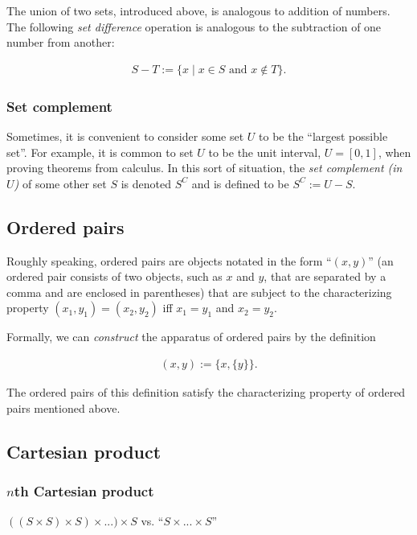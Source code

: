 The union of two sets, introduced above, is analogous to addition of numbers. The following \textit{set difference} operation is analogous to the subtraction of one number from another:

\begin{align*}
    S - T := \{ x \mid x \in S \text{ and } x \notin T \}.
\end{align*}

\subsubsection*{Set complement}

Sometimes, it is convenient to consider some set $U$ to be the ``largest possible set''. For example, it is common to set $U$ to be the unit interval, $U = [0, 1]$, when proving theorems from calculus. In this sort of situation, the \textit{set complement (in $U$)} of some other set $S$ is denoted $S^C$ and is defined to be $S^C := U - S$.

\subsection*{Ordered pairs}

Roughly speaking, ordered pairs are objects notated in the form ``$(x, y)$'' (an ordered pair consists of two objects, such as $x$ and $y$, that are separated by a comma and are enclosed in parentheses) that are subject to the characterizing property $(x_1, y_1) = (x_2, y_2)$ iff $x_1 = y_1$ and $x_2 = y_2$. 

Formally, we can \textit{construct} the apparatus of ordered pairs by the definition

\begin{align*}
    (x, y) := \{x, \{y\}\}.
\end{align*}

The ordered pairs of this definition satisfy the characterizing property of ordered pairs mentioned above.

\subsection*{Cartesian product}

\subsubsection*{$n$th Cartesian product}

$((S \times S) \times S) \times ...) \times S$ vs. ``$S \times ... \times S$''

